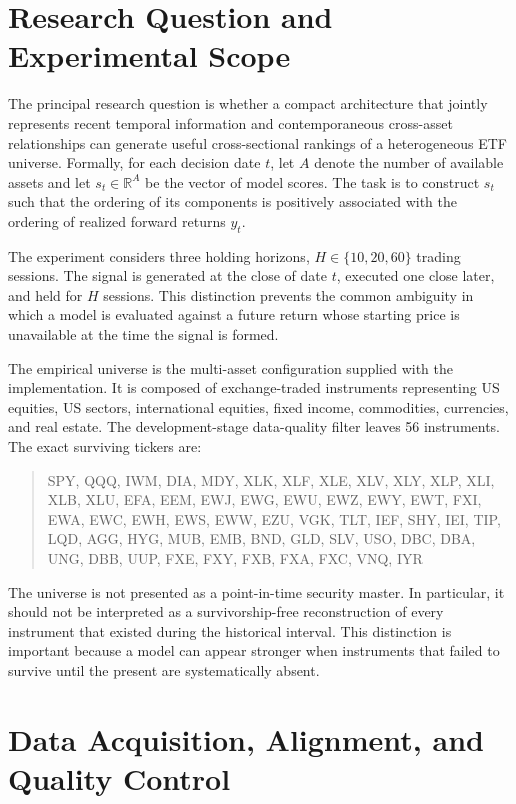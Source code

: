 \documentclass[10pt]{article}
\begin{document}
\section{Research Question and Experimental Scope}

The principal research question is whether a compact architecture that jointly represents recent temporal information and contemporaneous cross-asset relationships can generate useful cross-sectional rankings of a heterogeneous ETF universe. Formally, for each decision date $t$, let $A$ denote the number of available assets and let $s_t\in\mathbb{R}^{A}$ be the vector of model scores. The task is to construct $s_t$ such that the ordering of its components is positively associated with the ordering of realized forward returns $y_t$.

The experiment considers three holding horizons, $H\in\{10,20,60\}$ trading sessions. The signal is generated at the close of date $t$, executed one close later, and held for $H$ sessions. This distinction prevents the common ambiguity in which a model is evaluated against a future return whose starting price is unavailable at the time the signal is formed.

The empirical universe is the multi-asset configuration supplied with the implementation. It is composed of exchange-traded instruments representing US equities, US sectors, international equities, fixed income, commodities, currencies, and real estate. The development-stage data-quality filter leaves 56 instruments. The exact surviving tickers are:
\begin{quote}
SPY, QQQ, IWM, DIA, MDY, XLK, XLF, XLE, XLV, XLY, XLP, XLI, XLB, XLU, EFA, EEM, EWJ, EWG, EWU, EWZ, EWY, EWT, FXI, EWA, EWC, EWH, EWS, EWW, EZU, VGK, TLT, IEF, SHY, IEI, TIP, LQD, AGG, HYG, MUB, EMB, BND, GLD, SLV, USO, DBC, DBA, UNG, DBB, UUP, FXE, FXY, FXB, FXA, FXC, VNQ, IYR
\end{quote}

The universe is not presented as a point-in-time security master. In particular, it should not be interpreted as a survivorship-free reconstruction of every instrument that existed during the historical interval. This distinction is important because a model can appear stronger when instruments that failed to survive until the present are systematically absent.

\section{Data Acquisition, Alignment, and Quality Control}
\end{document}
